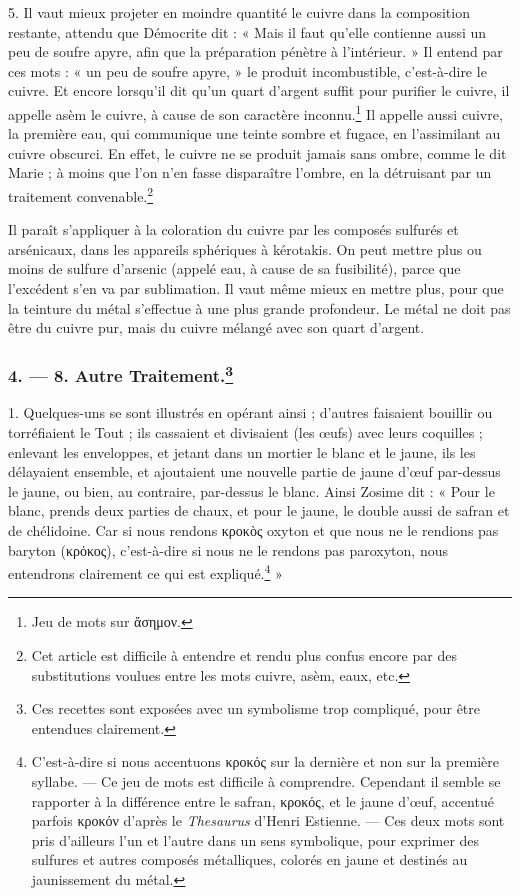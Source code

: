 \documentclass[a4paper, 11pt, oneside, polutonikogreek, french]{article}
\begin{document}
5. Il vaut mieux projeter en moindre quantité le cuivre dans la composition restante, attendu que Démocrite dit : « Mais il faut qu'elle contienne aussi un peu de soufre apyre, afin que la préparation pénètre à l'intérieur. » Il entend par ces mots : « un peu de soufre apyre, » le produit incombustible, c'est-à-dire le cuivre. Et encore lorsqu'il dit qu'un quart d'argent suffit pour purifier le cuivre, il appelle asèm le cuivre, à cause de son caractère inconnu.\footnote{Jeu de mots sur ἄσημον.} Il appelle aussi cuivre, la première eau, qui communique une teinte sombre et fugace, en l'assimilant au cuivre obscurci. En effet, le cuivre ne se produit jamais sans ombre, comme le dit Marie ; à moins que l'on n'en fasse disparaître l'ombre, en la détruisant par un traitement convenable.\footnote{Cet article est difficile à entendre et rendu plus confus encore par des substitutions voulues entre les mots cuivre, asèm, eaux, etc.  }

Il paraît s'appliquer à la coloration du cuivre par les composés sulfurés et arsénicaux, dans les appareils sphériques à kérotakis. On peut mettre plus ou moins de sulfure d'arsenic (appelé eau, à cause de sa fusibilité), parce que l'excédent s'en va par sublimation. Il vaut même mieux en mettre plus, pour que la teinture du métal s'effectue à une plus grande profondeur. Le métal ne doit pas être du cuivre pur, mais du cuivre mélangé avec son quart d'argent.

\bigskip
\centerline{\EightStarTaper}
\centerline{\EightStarTaper\EightStarTaper}
\bigskip

\subsubsection[4. --- 8. Autre Traitement.]{4. --- 8. Autre Traitement.\footnote{Ces recettes sont exposées avec un symbolisme trop compliqué, pour être entendues clairement.}}

1. Quelques-uns se sont illustrés en opérant ainsi ; d'autres faisaient bouillir ou torréfiaient le Tout ; ils cassaient et divisaient (les œufs) avec leurs coquilles ; enlevant les enveloppes, et jetant dans un mortier le blanc et le jaune, ils les délayaient ensemble, et ajoutaient une nouvelle partie de jaune d'œuf par-dessus le jaune, ou bien, au contraire, par-dessus le blanc. Ainsi Zosime dit : « Pour le blanc, prends deux parties de chaux, et pour le jaune, le double aussi de safran et de chélidoine. Car si nous rendons κροκὸς oxyton et que nous ne le rendions pas baryton (κρόκος), c'est-à-dire si nous ne le rendons pas paroxyton, nous entendrons clairement ce qui est expliqué.\footnote{C'est-à-dire si nous accentuons κροκός sur la dernière et non sur la première syllabe. --- Ce jeu de mots est difficile à comprendre. Cependant il semble se rapporter à la différence entre le safran, κροκός, et le jaune d'œuf, accentué parfois κροκόν d'après le \emph{Thesaurus} d'Henri Estienne. --- Ces deux mots sont pris d'ailleurs l'un et l'autre dans un sens symbolique, pour exprimer des sulfures et autres composés métalliques, colorés en jaune et destinés au jaunissement du métal.} »
\end{document}
